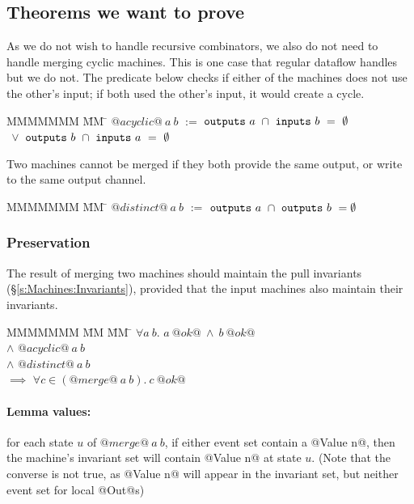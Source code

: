 \subsection{Theorems we want to prove}
\label{s:Proofs}

As we do not wish to handle recursive combinators, we also do not need to handle merging cyclic machines.
This is one case that regular dataflow handles but we do not.
The predicate below checks if either of the machines does not use the other's input; if both used the other's input, it would create a cycle.

\begin{tabbing}
MMMMMMM \= MM \= \kill
$@acyclic@~a~b$
\> $:=$
\> $\mathtt{outputs}~a~\cap~\mathtt{inputs}~b~=~\emptyset$
\\
\> $~\vee$ \> $\mathtt{outputs}~b~\cap~\mathtt{inputs}~a~=~\emptyset$
\end{tabbing}

Two machines cannot be merged if they both provide the same output, or write to the same output channel.

\begin{tabbing}
MMMMMMM \= MM \= \kill
$@distinct@~a~b$
\> $:=$
\> $\mathtt{outputs}~a~\cap~\mathtt{outputs}~b~=\emptyset$
\end{tabbing}

\subsubsection{Preservation}
The result of merging two machines should maintain the pull invariants (\S\ref{s:Machines:Invariants}), provided that the input machines also maintain their invariants.

\begin{tabbing}
MMMMMMM \= MM \= MM \= \kill
$\forall a~b.$
\>
\> $a~@ok@~\wedge~b~@ok@$
\\
\> $\wedge$
\> $@acyclic@~a~b$
\\
\> $\wedge$
\> $@distinct@~a~b$
\\
\> $\implies$
\> $\forall c \in (@merge@~a~b).\ c~@ok@$
\end{tabbing}

\paragraph{Lemma values:} 
for each state $u$ of $@merge@~a~b$, if either event set contain a @Value n@, then the machine's invariant set will contain @Value n@ at state $u$.
(Note that the converse is not true, as @Value n@ will appear in the invariant set, but neither event set for local @Out@s)

